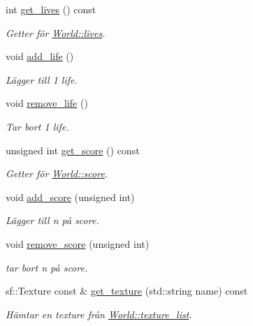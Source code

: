 \begin{DoxyCompactItemize}
int \hyperlink{classWorld_a6500dacbd84084f8ac056eaf04aa603b}{get\+\_\+lives} () const 
\begin{DoxyCompactList}\small\item\em Getter för \hyperlink{classWorld_af7d5c3e3405e2efaadf6cd76745440c6}{World\+::lives}. \end{DoxyCompactList}\item 
void \hyperlink{classWorld_ac7b43593b36fb380c433eddd3d075613}{add\+\_\+life} ()
\begin{DoxyCompactList}\small\item\em Lägger till 1 life. \end{DoxyCompactList}\item 
void \hyperlink{classWorld_aef42373ac6cd2f6bdacc22b7c1b14055}{remove\+\_\+life} ()
\begin{DoxyCompactList}\small\item\em Tar bort 1 life. \end{DoxyCompactList}\item 
unsigned int \hyperlink{classWorld_a999f330b74ecf28c164dcaf71423cbcb}{get\+\_\+score} () const 
\begin{DoxyCompactList}\small\item\em Getter för \hyperlink{classWorld_a8e0d399d947596356b65e8bcb5d4cad8}{World\+::score}. \end{DoxyCompactList}\item 
void \hyperlink{classWorld_ac5c27ebafb5832cd2aeac24afda475f6}{add\+\_\+score} (unsigned int)
\begin{DoxyCompactList}\small\item\em Lägger till n på score. \end{DoxyCompactList}\item 
void \hyperlink{classWorld_a697e8f216b1fa06d1b708e7847662d3a}{remove\+\_\+score} (unsigned int)
\begin{DoxyCompactList}\small\item\em tar bort n på score. \end{DoxyCompactList}\item 
sf\+::\+Texture const \& \hyperlink{classWorld_a5c35a088979ebddf7365eb3707400d2e}{get\+\_\+texture} (std\+::string name) const 
\begin{DoxyCompactList}\small\item\em Hämtar en texture från \hyperlink{classWorld_a77cc00620c137bb0b8b2620912b4dddc}{World\+::texture\+\_\+list}. \end{DoxyCompactList}\end{DoxyCompactItemize}
